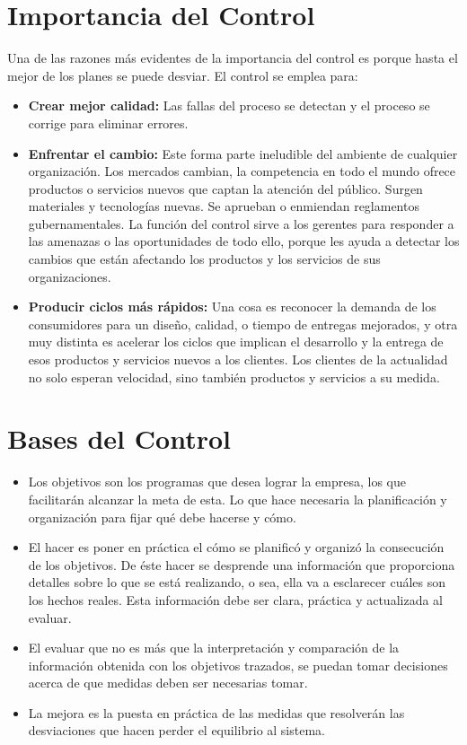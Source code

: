 \documentclass[12pt,letterpaper]{book}
\begin{document}
\section{Importancia del Control}
Una de las razones más evidentes de la importancia del control es porque hasta el mejor de los planes se puede desviar. El control se emplea para:
\begin{itemize}
\item \textbf{Crear mejor calidad:} Las fallas del proceso se detectan y el proceso se corrige para eliminar errores.
\item \textbf{Enfrentar el cambio:} Este forma parte ineludible del ambiente de cualquier organización. Los mercados cambian, la competencia en todo el mundo ofrece productos o servicios nuevos que captan la atención del público. Surgen materiales y tecnologías nuevas. Se aprueban o enmiendan reglamentos gubernamentales. La función del control sirve a los gerentes para responder a las amenazas o las oportunidades de todo ello, porque les ayuda a detectar los cambios que están afectando los productos y los servicios de sus organizaciones.
\item \textbf{Producir ciclos más rápidos:} Una cosa es reconocer la demanda de los consumidores para un diseño, calidad, o tiempo de entregas mejorados, y otra muy distinta es acelerar los ciclos que implican el desarrollo y la entrega de esos productos y servicios nuevos a los clientes. Los clientes de la actualidad no solo esperan velocidad, sino también productos y servicios a su medida.
\end{itemize}
\section{Bases del Control}
\begin{itemize}
\item	Los objetivos son los programas que desea lograr la empresa, los que facilitarán alcanzar la meta de esta. Lo que hace necesaria la planificación y organización para fijar qué debe hacerse y cómo.
\item 	El hacer es poner en práctica el cómo se planificó y organizó la consecución de los objetivos. De éste hacer se desprende una información que proporciona detalles sobre lo que se está realizando, o sea, ella va a esclarecer cuáles son los hechos reales. Esta información debe ser clara, práctica y actualizada al evaluar.
\item	El evaluar que no es más que la interpretación y comparación de la información obtenida con los objetivos trazados, se puedan tomar decisiones acerca de que medidas deben ser necesarias tomar.
\item	La mejora es la puesta en práctica de las medidas que resolverán las desviaciones que hacen perder el equilibrio al sistema.
\end{itemize}
\end{document}
